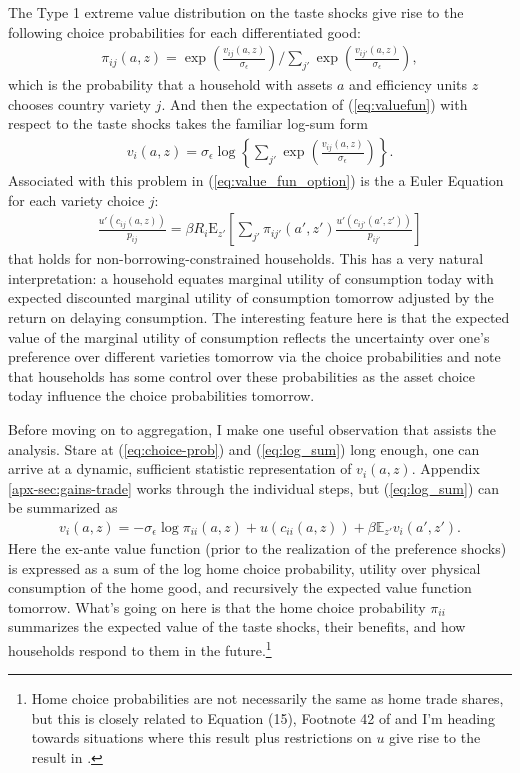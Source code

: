 \documentclass[12pt,pdftex]{article}
\begin{document}
\begin{onehalfspacing}
The Type 1 extreme value distribution on the taste shocks give rise to the following choice probabilities for each differentiated good:
\begin{align}
\pi_{ij}(a, z) = \exp \left( \frac{ v_{ij}(a, z) }{\sigma_{\epsilon}} \right) \Bigg / \sum_{j'} \exp \left( \frac{ v_{ij'}(a, z) }{\sigma_{\epsilon}} \right), \label{eq:choice-prob}
\end{align}
which is the probability that a household with assets $a$ and efficiency units $z$ chooses country variety $j$. And then the expectation of (\ref{eq:valuefun}) with respect to the taste shocks takes the familiar log-sum form
\begin{align}
v_i(a, z) = \sigma_{\epsilon} \log \left\{ \sum_{j'} \exp \left( \frac{  v_{ij}(a, z)}{\sigma_{\epsilon}} \right) \right\}. \label{eq:log_sum}
\end{align}
Associated with this problem in (\ref{eq:value_fun_option}) is the a Euler Equation for each variety choice $j$:
\begin{align}
\frac{u'(c_{ij}(a, z))}{p_{ij}} = \beta R_{i} \mathrm{E}_{z'} \left[ \sum_{j'} \pi_{ij'}(a', z') \frac{u'(c_{ij'}(a', z'))}{p_{ij'}} \right]
\label{eq:euler_equation}
\end{align}
that holds for non-borrowing-constrained households. This has a very natural interpretation: a household equates marginal utility of consumption today with expected discounted marginal utility of consumption tomorrow adjusted by the return on delaying consumption. The interesting feature here is that the expected value of the marginal utility of consumption reflects the uncertainty over one's preference over different varieties tomorrow via the choice probabilities and note that households has some control over these probabilities as the asset choice today influence the choice probabilities tomorrow.

Before moving on to aggregation, I make one useful observation that assists the analysis. Stare at (\ref{eq:choice-prob}) and (\ref{eq:log_sum}) long enough, one can arrive at a dynamic, sufficient statistic representation of $v_i(a, z)$. Appendix \ref{apx-sec:gains-trade} works through the individual steps, but (\ref{eq:log_sum}) can be summarized as
\begin{align}
v_i(a, z) = -\sigma_{\epsilon} \log \pi_{ii}(a,z) + u(c_{ii}(a,z)) + \beta \mathbb{E}_{z'} v_{i}(a',z').
\label{eq:log_sum-home}
\end{align}
Here the ex-ante value function (prior to the realization of the preference shocks) is expressed as a sum of the log home choice probability, utility over physical consumption of the home good, and recursively the expected value function tomorrow. What's going on here is that the home choice probability $\pi_{ii}$ summarizes the expected value of the taste shocks, their benefits, and how households respond to them in the future.\footnote{Home choice probabilities are not necessarily the same as home trade shares, but this is closely related to Equation (15), Footnote 42 of \citet{eaton2002technology} and I'm heading towards situations where this result plus restrictions on $u$ give rise to the result in \citet{arkolakis2012new}.}


\end{onehalfspacing}
\end{document}
